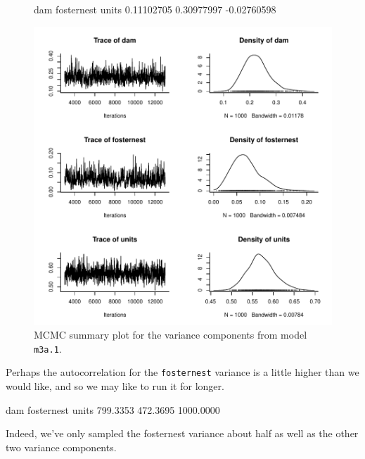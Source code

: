 \documentclass{article}
\begin{document}
\begin{figure}[!h]
\begin{center}
\begin{Schunk}
\begin{Soutput}
        dam  fosternest       units 
 0.11102705  0.30977997 -0.02760598 
\end{Soutput}
\end{Schunk}
\includegraphics{Lecture3-005}
\end{center}
\caption{MCMC summary plot for the variance components from model \texttt{m3a.1}.}
\label{mBTVCV-fig}
\end{figure}

Perhaps the autocorrelation for the \texttt{fosternest} variance is a little higher than we would like, and so we may like to run it for longer.

\begin{Schunk}
\begin{Soutput}
       dam fosternest      units 
  799.3353   472.3695  1000.0000 
\end{Soutput}
\end{Schunk}

Indeed, we've only sampled the fosternest variance about half as well as the other two variance components.\\
\end{document}
